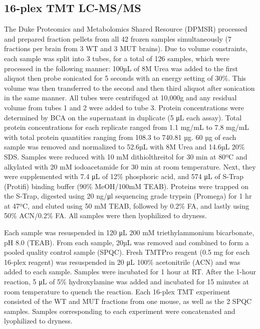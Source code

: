 \subsection{16-plex TMT LC-MS/MS} The Duke Proteomics and Metabolomics Shared
Resource (DPMSR) processed and prepared fraction pellets from all 42 frozen
samples simultaneously (7 fractions per brain from 3 WT and 3 MUT brains). Due
to volume constraints, each sample was split into 3 tubes, for a total of 126
samples, which were processed in the following manner: 100µL of 8M Urea was
added to the first aliquot then probe sonicated for 5 seconds with an energy
setting of 30\%. This volume was then transferred to the second and then third
aliquot after sonication in the same manner. All tubes were centrifuged at
10,000g and any residual volume from tubes 1 and 2 were added to tube 3. Protein
concentrations were determined by BCA on the supernatant in duplicate (5 μL each
assay). Total protein concentrations for each replicate ranged from 1.1 mg/mL to
7.8 mg/mL with total protein quantities ranging from 108.3 to 740.81 µg. 60 µg
of each sample was removed and normalized to 52.6µL with 8M Urea and 14.6µL 20\%
SDS. Samples were reduced with 10 mM dithiolthreitol for 30 min at 80ºC and
alkylated with 20 mM iodoacetamide for 30 min at room temperature. Next, they
were supplemented with 7.4 μL of 12\% phosphoric acid, and 574 μL of S-Trap
(Protifi) binding buffer (90\% MeOH/100mM TEAB). Proteins were trapped on the
S-Trap, digested using 20 ng/μl sequencing grade trypsin (Promega) for 1 hr at
47ºC, and eluted using 50 mM TEAB, followed by 0.2\% FA, and lastly using 50\%
ACN/0.2\% FA. All samples were then lyophilized to dryness.

Each sample was resuspended in 120 μL 200 mM triethylammonium bicarbonate, pH
8.0 (TEAB). From each sample, 20µL was removed and combined to form a pooled
quality control sample (SPQC). Fresh TMTPro reagent (0.5 mg for each 16-plex
reagent) was resuspended in 20 μL 100\% acetonitrile (ACN) and was added to each
sample. Samples were incubated for 1 hour at RT. After the 1-hour reaction, 5 μL
of 5\% hydroxylamine was added and incubated for 15 minutes at room temperature
to quench the reaction. Each 16-plex TMT experiment consisted of the WT and MUT
fractions from one mouse, as well as the 2 SPQC samples. Samples corresponding
to each experiment were concatenated and lyophilized to dryness.

